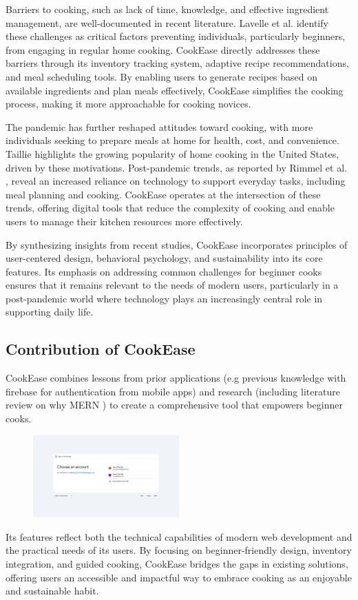 \documentclass[10pt,twocolumn]{article}
\begin{document}
Barriers to cooking, such as lack of time, knowledge, and effective ingredient management, are well-documented in recent literature. Lavelle et al. \cite{Lavelle2016} identify these challenges as critical factors preventing individuals, particularly beginners, from engaging in regular home cooking. CookEase directly addresses these barriers through its inventory tracking system, adaptive recipe recommendations, and meal scheduling tools. By enabling users to generate recipes based on available ingredients and plan meals effectively, CookEase simplifies the cooking process, making it more approachable for cooking novices.

The pandemic has further reshaped attitudes toward cooking, with more individuals seeking to prepare meals at home for health, cost, and convenience. Taillie \cite{Taillie2018} highlights the growing popularity of home cooking in the United States, driven by these motivations. Post-pandemic trends, as reported by Rimmel et al. \cite{Rimel2023}, reveal an increased reliance on technology to support everyday tasks, including meal planning and cooking. CookEase operates at the intersection of these trends, offering digital tools that reduce the complexity of cooking and enable users to manage their kitchen resources more effectively.

By synthesizing insights from recent studies, CookEase incorporates principles of user-centered design, behavioral psychology, and sustainability into its core features. Its emphasis on addressing common challenges for beginner cooks ensures that it remains relevant to the needs of modern users, particularly in a post-pandemic world where technology plays an increasingly central role in supporting daily life.

\subsection{Contribution of CookEase}
CookEase combines lessons from prior applications (e.g previous knowledge with firebase for authentication from mobile apps) and research (including literature review on why MERN \cite{Bafna2022} \cite{IJCRT2023}) to create a comprehensive tool that empowers beginner cooks. 
\begin{figure}[h!]
\includegraphics[width=0.5\textwidth]{images/GoogleSignIn.png}
\centering
\end{figure} 
Its features reflect both the technical capabilities of modern web development and the practical needs of its users. By focusing on beginner-friendly design, inventory integration, and guided cooking, CookEase bridges the gaps in existing solutions, offering users an accessible and impactful way to embrace cooking as an enjoyable and sustainable habit.
\end{document}

